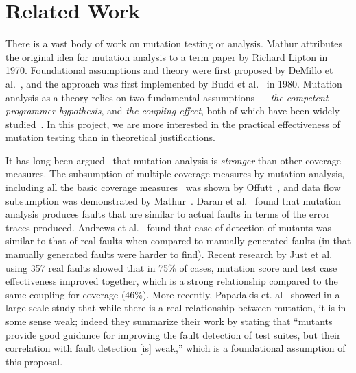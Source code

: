 \section{Related Work}

There is a vast body of work on mutation testing or analysis.  Mathur attributes~\cite{mathur2012foundations} the original idea for mutation analysis
to a term paper by Richard Lipton in 1970. Foundational assumptions and
theory were first proposed by DeMillo et al.~\cite{demillo1978hints},
and the approach was first implemented by Budd et al.~\cite{budd1980theoretical} in 1980.
Mutation analysis as a theory relies on two fundamental
assumptions --- \emph{the competent programmer hypothesis},
and \emph{the coupling effect}, both of which have been widely
studied~\cite{wah2000atheoretical,wah2003ananalysis,gopinath2017the,offutt1989thecoupling,offutt1992investigations,langdon2010efficient,gopinath2017the,gopinath2014mutations}. In
this project, we are more interested in the practical effectiveness of
mutation testing than in theoretical justifications.

It has long been argued~\cite{budd1980mutation} that mutation analysis is \emph{stronger}
than other coverage measures. The subsumption of multiple coverage
measures by mutation analysis, including all the basic coverage measures~\cite{myer1979art}
was shown by Offutt~\cite{offutt1996subsumption}, and data flow
subsumption was demonstrated by Mathur~\cite{mathur1994empirical}.
Daran et al.~\cite{daran1996software} found that mutation analysis produces
faults that are similar to actual faults in terms of the error traces produced. Andrews et
al.~\cite{andrews2005mutation,andrews2006using} found that ease of detection
of mutants was similar to that of real faults when compared to manually
generated faults (in that manually generated faults were harder to find).
Recent research by Just et al.~\cite{just2014mutants} using 357 real faults
showed that in 75\% of cases, mutation score and test case
effectiveness improved together, which is a strong relationship
compared to the same coupling for coverage (46\%).  More recently,
Papadakis et. al~\cite{papadakis2018mutation} showed in a large scale study that while there is a
real relationship between mutation, it is in some sense weak; indeed
they summarize their work by stating that ``mutants provide good guidance for improving the
fault detection of test suites, but their correlation with fault
detection [is] weak,'' which is a foundational assumption of this proposal.

